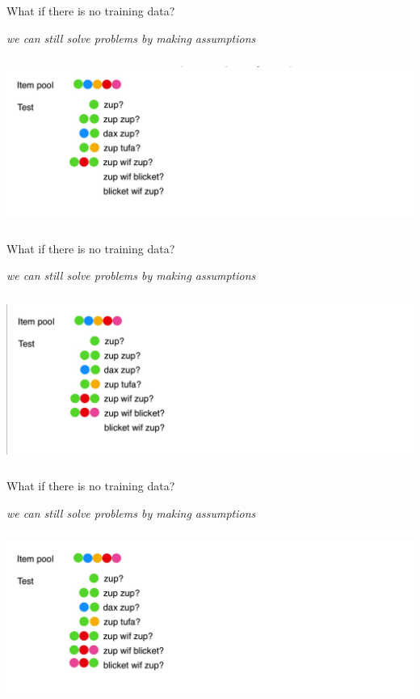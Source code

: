\documentclass[aspectratio=169,t,handout,xcolor={usenames,dvipsnames}]{beamer}
\begin{document}
\begin{frame}{What if there is no training data?}
\centerline{\textit{we can still solve problems by making assumptions}}
\centering\includegraphics[height=5.5cm]{image/Jietu20220328-192229.jpg}

\end{frame}
\begin{frame}{What if there is no training data?}
\centerline{\textit{we can still solve problems by making assumptions}}
\centering\includegraphics[height=5.5cm]{image/Jietu20220328-192318.jpg}

\end{frame}
\begin{frame}{What if there is no training data?}
\centerline{\textit{we can still solve problems by making assumptions}}
\centering\includegraphics[height=5.5cm]{image/Jietu20220328-192345.jpg}

\end{frame}
\end{document}
